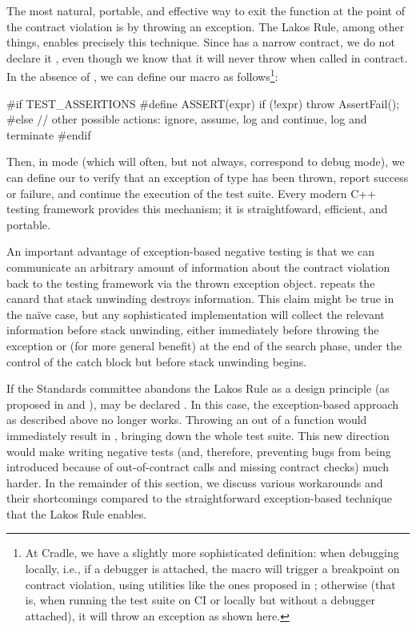 The most natural, portable, and effective way to exit the function at the point of the contract violation is by throwing an exception. The Lakos Rule, among other things, enables precisely this technique. Since  has a narrow contract, we do not declare it , even though we know that it will never throw when called in contract. In the absence of , we can define our  macro as follows\footnote{At Cradle, we have a slightly more sophisticated definition: when debugging locally, i.e., if a debugger is attached, the  macro will trigger a breakpoint on contract violation, using utilities like the ones proposed in \cite{P2514R0}; otherwise (that is, when running the test suite on CI or locally but without a debugger attached), it will throw an  exception as shown here.}:
\begin{codeblock}
#if TEST_ASSERTIONS
  #define ASSERT(expr) if (!expr) throw AssertFail();
#else
  // other possible actions: ignore, assume, log and continue, log and terminate
#endif
\end{codeblock}
Then, in  mode (which will often, but not always, correspond to debug mode), we can define our  to verify that an exception of type  has been thrown, report success or failure, and continue the execution of the test suite. Every modern C++ testing framework provides this mechanism; it is straightfoward, efficient, and portable.

An important advantage of exception-based negative testing is that we can communicate an arbitrary amount of information about the contract violation back to the testing framework via the thrown exception object. \cite{P1656R2} repeats the canard that stack unwinding destroys information. This claim might be true in the na\" ive case, but any sophisticated implementation will collect the relevant information before stack unwinding, either immediately before throwing the exception or (for more general benefit) at the end of the search phase, under the control of the catch block but before stack unwinding begins.

If the Standards committee abandons the Lakos Rule as a design principle (as proposed in \cite{P1656R2} and \cite{P2148R0}),  may be declared . In this case, the exception-based approach as described above no longer works. Throwing an  out of a  function would immediately result in , bringing down the whole test suite. This new direction would make writing negative tests (and, therefore, preventing bugs from being introduced because of out-of-contract calls and missing contract checks) much harder. In the remainder of this section, we discuss various workarounds and their shortcomings compared to the straightforward exception-based technique that the Lakos Rule enables.

